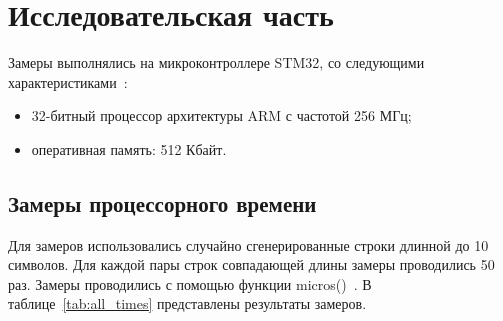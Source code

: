 \chapter{Исследовательская часть}

Замеры выполнялись на микроконтроллере STM32, со следующими характеристиками~\cite{stm32}:
\begin{itemize}[label=---]
	\item 32-битный процессор архитектуры ARM с частотой 256 МГц;
	\item оперативная память: 512 Кбайт.
\end{itemize}

\section{Замеры процессорного времени}

Для замеров использовались случайно сгенерированные строки длинной до 10 символов. Для каждой пары строк совпадающей длины замеры проводились 50 раз. Замеры проводились с  помощью функции micros()~\cite{micros}. В таблице~\ref{tab:all_times} представлены результаты замеров.

